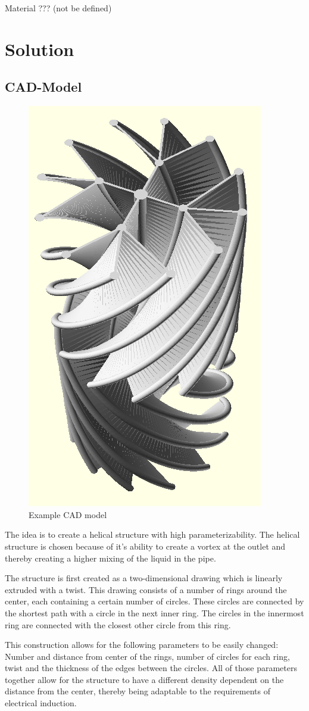 \documentclass[journal,article,submit,moreauthors,pdftex]{Definitions/mdpi}
\begin{document}
Material ??? (not be defined)


\section{Solution}

\subsection{CAD-Model}

\begin{figure}
\centerline{\includegraphics[height=0.48\textwidth]{./docu_pictures/simple_double_part.png}}
\caption{Example CAD model}
\label{cad-number-of-objects}
\end{figure}

The idea is to create a helical structure with high parameterizability. The helical structure is chosen because of it's ability to create a vortex at the outlet and thereby creating a higher mixing of the liquid in the pipe. 

The structure is first created as a two-dimensional drawing which is linearly extruded with a twist. This drawing consists of a number of rings around the center, each containing a certain number of circles. These circles are connected by the shortest path with a circle in the next inner ring. The circles in the innermost ring are connected with the closest other circle from this ring.

This construction allows for the following parameters to be easily changed: Number and distance from center of the rings, number of circles for each ring, twist and the thickness of the edges between the circles. All of those parameters together allow for the structure to have a different density dependent on the distance from the center, thereby being adaptable to the requirements of electrical induction.
\end{document}
